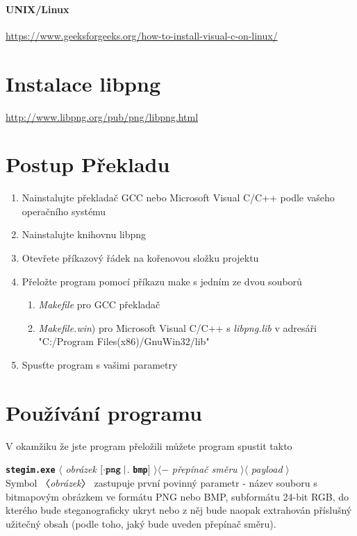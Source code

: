 \documentclass[12pt]{report}
\begin{document}
\paragraph{UNIX/Linux}
    \href{https://www.geeksforgeeks.org/how-to-install-visual-c-on-linux/}{https://www.geeksforgeeks.org/how-to-install-visual-c-on-linux/}


    \section{Instalace libpng}
    \href{http://www.libpng.org/pub/png/libpng.htm}{http://www.libpng.org/pub/png/libpng.html}


    \section{Postup Překladu}
    \begin{enumerate}
        \item Nainstalujte překladač GCC nebo Microsoft Visual C/C++ podle vašeho operačního systému
        \item Nainstalujte knihovnu libpng
        \item  Otevřete příkazový řádek na kořenovou složku projektu
        \item  Přeložte program pomocí příkazu make s jedním ze dvou souborů
        \begin{enumerate}
            \item \textit{ Makefile} pro GCC překladač
            \item \textit{  Makefile.win}) pro Microsoft Visual C/C++ s \textit{libpng.lib} v adresáři "C:/Program Files(x86)/GnuWin32/lib"
        \end{enumerate}
        \item  Spusťte program s vašimi parametry
    \end{enumerate}

    \section{Používání programu}
    V okamžiku že jste program přeložili můžete program spustit takto

    \texttt{\textbf{stegim.exe}} $\langle$ \textit{obrázek} $[\cdot \mathrm{\texttt{\textbf{png}}} \mid$. \texttt{\textbf{bmp}}] $\rangle\langle-$ \textit{přepínač směru} $\rangle\langle$ \textit{payload} $\rangle$\\

    Symbol 〈\textit{obrázek}〉 zastupuje první povinný parametr - název souboru s bitmapovým obrázkem ve formátu PNG nebo BMP, subformátu 24-bit RGB, do kterého bude steganograficky ukryt nebo
    z něj bude naopak extrahován příslušný užitečný obsah (podle toho, jaký bude uveden přepínač směru).
\end{document}
